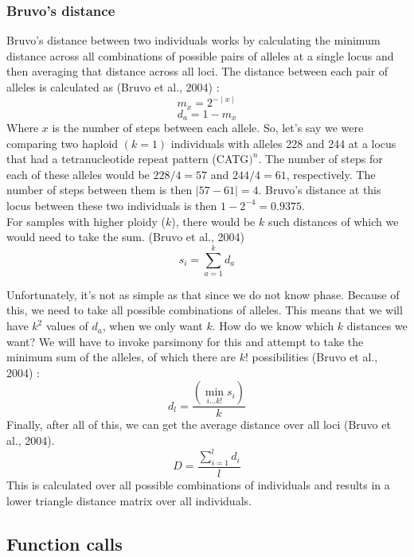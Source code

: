 \documentclass[letterpaper]{article}
\newcommand{\beq}{\begin{equation}}
\newcommand{\eeq}{\end{equation}}
\newcommand{\tab}{\hspace*{1em}}
\begin{document}
\subsubsection{Bruvo's distance}

\tab \tab Bruvo's distance between two individuals works by calculating the minimum distance across all combinations of possible pairs of alleles at a single locus and then averaging that distance across all loci. \cite{Bruvo:2004} The distance between each pair of alleles is calculated as (Bruvo et al., 2004) \cite{Bruvo:2004}:
\beq
m_x = 2^{-\mid x \mid}
\eeq
\beq
d_a = 1 - m_x
\eeq
Where $x$ is the number of steps between each allele. So, let's say we were comparing two haploid $(k = 1)$ individuals with alleles 228 and 244 at a locus that had a tetranucleotide repeat pattern (CATG$)^n$. The number of steps for each of these alleles would be $228/4 = 57$ and $244/4 =61$, respectively. The number of steps between them is then $\mid 57 - 61 \mid = 4$. Bruvo's distance at this locus between these two individuals is then $1-2^{-4} = 0.9375$.\\
For samples with higher ploidy ($k$), there would be $k$ such distances of which we would need to take the sum. (Bruvo et al., 2004) \cite{Bruvo:2004}
\beq
s_i = \displaystyle \sum_{a=1}^{k} d_a
\eeq

Unfortunately, it's not as simple as that since we do not know phase. Because of this, we need to take all possible combinations of alleles. This means that we will have $k^2$ values of $d_a$, when we only want $k$. How do we know which $k$ distances we want? We will have to invoke parsimony for this and attempt to take the minimum sum of the alleles, of which there are $k!$ possibilities (Bruvo et al., 2004) \cite{Bruvo:2004}:
\beq
d_l = \frac{\left(\displaystyle \min_{i \dotsc k!} s_i\right)}{k}
\eeq
Finally, after all of this, we can get the average distance over all loci (Bruvo et al., 2004). 
\beq
D = \frac{\displaystyle \sum_{i=1}^l d_i}{l}
\eeq
This is calculated over all possible combinations of individuals and results in a lower triangle distance matrix over all individuals. 
\subsection{Function calls}
\end{document}
